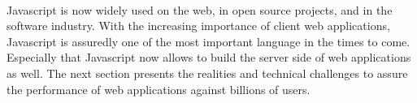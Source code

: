 \paragraph{}

Javascript is now widely used on the web, in open source projects, and in the software industry.
With the increasing importance of client web applications, Javascript is assuredly one of the most important language in the times to come.
Especially that Javascript now allows to build the server side of web applications as well.
The next section presents the realities and technical challenges to assure the performance of web applications against billions of users.






